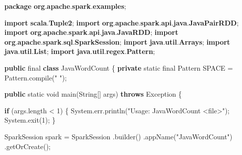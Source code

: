 \documentclass[
]{article}
\newenvironment{Shaded}{}{}
\newcommand{\BuiltInTok}[1]{\textcolor[rgb]{0.00,0.50,0.00}{#1}}
\newcommand{\ControlFlowTok}[1]{\textcolor[rgb]{0.00,0.44,0.13}{\textbf{#1}}}
\newcommand{\DataTypeTok}[1]{\textcolor[rgb]{0.56,0.13,0.00}{#1}}
\newcommand{\DecValTok}[1]{\textcolor[rgb]{0.25,0.63,0.44}{#1}}
\newcommand{\FunctionTok}[1]{\textcolor[rgb]{0.02,0.16,0.49}{#1}}
\newcommand{\ImportTok}[1]{\textcolor[rgb]{0.00,0.50,0.00}{\textbf{#1}}}
\newcommand{\KeywordTok}[1]{\textcolor[rgb]{0.00,0.44,0.13}{\textbf{#1}}}
\newcommand{\NormalTok}[1]{#1}
\newcommand{\OperatorTok}[1]{\textcolor[rgb]{0.40,0.40,0.40}{#1}}
\newcommand{\StringTok}[1]{\textcolor[rgb]{0.25,0.44,0.63}{#1}}
\begin{document}
\begin{Shaded}
\begin{Highlighting}[]
\KeywordTok{package}\ImportTok{ org}\OperatorTok{.}\ImportTok{apache}\OperatorTok{.}\ImportTok{spark}\OperatorTok{.}\ImportTok{examples}\OperatorTok{;}

\KeywordTok{import} \ImportTok{scala}\OperatorTok{.}\ImportTok{Tuple2}\OperatorTok{;}
\KeywordTok{import} \ImportTok{org}\OperatorTok{.}\ImportTok{apache}\OperatorTok{.}\ImportTok{spark}\OperatorTok{.}\ImportTok{api}\OperatorTok{.}\ImportTok{java}\OperatorTok{.}\ImportTok{JavaPairRDD}\OperatorTok{;}
\KeywordTok{import} \ImportTok{org}\OperatorTok{.}\ImportTok{apache}\OperatorTok{.}\ImportTok{spark}\OperatorTok{.}\ImportTok{api}\OperatorTok{.}\ImportTok{java}\OperatorTok{.}\ImportTok{JavaRDD}\OperatorTok{;}
\KeywordTok{import} \ImportTok{org}\OperatorTok{.}\ImportTok{apache}\OperatorTok{.}\ImportTok{spark}\OperatorTok{.}\ImportTok{sql}\OperatorTok{.}\ImportTok{SparkSession}\OperatorTok{;}
\KeywordTok{import} \ImportTok{java}\OperatorTok{.}\ImportTok{util}\OperatorTok{.}\ImportTok{Arrays}\OperatorTok{;}
\KeywordTok{import} \ImportTok{java}\OperatorTok{.}\ImportTok{util}\OperatorTok{.}\ImportTok{List}\OperatorTok{;}
\KeywordTok{import} \ImportTok{java}\OperatorTok{.}\ImportTok{util}\OperatorTok{.}\ImportTok{regex}\OperatorTok{.}\ImportTok{Pattern}\OperatorTok{;}

\KeywordTok{public} \DataTypeTok{final} \KeywordTok{class}\NormalTok{ JavaWordCount }\OperatorTok{\{}
  \KeywordTok{private} \DataTypeTok{static} \DataTypeTok{final} \BuiltInTok{Pattern}\NormalTok{ SPACE }\OperatorTok{=} \BuiltInTok{Pattern}\OperatorTok{.}\FunctionTok{compile}\OperatorTok{(}\StringTok{" "}\OperatorTok{);}

  \KeywordTok{public} \DataTypeTok{static} \DataTypeTok{void} \FunctionTok{main}\OperatorTok{(}\BuiltInTok{String}\OperatorTok{[]}\NormalTok{ args}\OperatorTok{)} \KeywordTok{throws} \BuiltInTok{Exception} \OperatorTok{\{}

    \ControlFlowTok{if} \OperatorTok{(}\NormalTok{args}\OperatorTok{.}\FunctionTok{length} \OperatorTok{\textless{}} \DecValTok{1}\OperatorTok{)} \OperatorTok{\{}
      \BuiltInTok{System}\OperatorTok{.}\FunctionTok{err}\OperatorTok{.}\FunctionTok{println}\OperatorTok{(}\StringTok{"Usage: JavaWordCount \textless{}file\textgreater{}"}\OperatorTok{);}
      \BuiltInTok{System}\OperatorTok{.}\FunctionTok{exit}\OperatorTok{(}\DecValTok{1}\OperatorTok{);}
    \OperatorTok{\}}

\NormalTok{    SparkSession spark }\OperatorTok{=}\NormalTok{ SparkSession}
      \OperatorTok{.}\FunctionTok{builder}\OperatorTok{()}
      \OperatorTok{.}\FunctionTok{appName}\OperatorTok{(}\StringTok{"JavaWordCount"}\OperatorTok{)}
      \OperatorTok{.}\FunctionTok{getOrCreate}\OperatorTok{();}


\end{Highlighting}
\end{Shaded}
\end{document}
